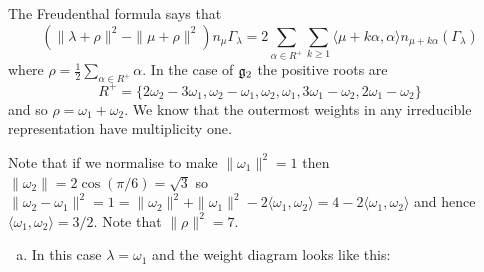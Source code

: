 \documentclass[12pt]{article}
\begin{document}
\iffalse
\begin{answer}
The Freudenthal formula says that
\[\left(\|\lambda+\rho\|^2-\|\mu+\rho\|^2\right)n_{\mu}\Gamma_{\lambda}=2\sum_{\alpha\in R^+}\sum_{k\geq 1}\langle\mu+k\alpha,\alpha\rangle n_{\mu+k\alpha}(\Gamma_{\lambda})\]
where $\rho=\frac{1}{2}\sum_{\alpha\in R^+}\alpha$. In the case of $\mathfrak{g}_2$ the positive roots are
\[R^+=\{2\omega_2-3\omega_1,\omega_2-\omega_1,\omega_2,\omega_1,3\omega_1-\omega_2,2\omega_1-\omega_2\}\]
and so $\rho=\omega_1+\omega_2$. We know that the outermost weights in any irreducible representation have multiplicity one.

Note that if we normalise to make $\|\omega_1\|^2=1$ then $\|\omega_2\|=2\cos(\pi/6)=\sqrt{3}$ so $\|\omega_2-\omega_1\|^2=1=\|\omega_2\|^2+\|\omega_1\|^2-2\langle\omega_1,\omega_2\rangle=4-2\langle\omega_1,\omega_2\rangle$ and hence $\langle\omega_1,\omega_2\rangle=3/2$. Note that $\|\rho\|^2=7$.
\begin{enumerate}[(a)]
\item In this case $\lambda=\omega_1$ and the weight diagram looks like this:

\gtwolambdaonezero


\end{enumerate}
\end{answer}
\end{document}
